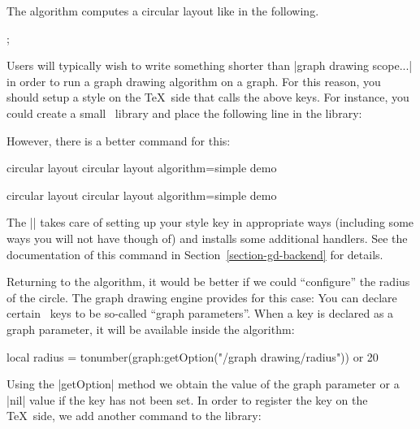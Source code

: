 The algorithm computes a circular layout like in the following.

\begin{codeexample}[]
\tikz [graph drawing scope, /graph drawing/algorithm=simple demo]
  ;
\end{codeexample}

Users will typically wish to write something shorter than
|graph drawing scope...| in order to run a graph drawing algorithm on
a graph. For this reason, you should setup a style on the \TeX\ side
that calls the above keys. For instance, you could create a small
\tikzname\ library and place the following line in the library:
\begin{codeexample}
\end{codeexample}
However, there is a better command for this:
\begin{codeexample}[code only]
\pgfgddeclarealgorithmkey
{circular layout}
{circular layout}
{algorithm=simple demo}
{}
\end{codeexample}
\pgfgddeclarealgorithmkey
{circular layout}
{circular layout}
{algorithm=simple demo}
{}

The |\pgfgddeclarealgorithmkey| takes care of setting up your style
key in appropriate ways (including some ways you will not have though
of) and installs some additional handlers. See the documentation of
this command in Section~\ref{section-gd-backend} for details. 

Returning to the algorithm, it would be better if we could
``configure'' the radius of the circle. The graph drawing engine
provides for this case: You can declare certain \pgfname\ keys to be
so-called ``graph parameters''. When a key is declared as a graph
parameter, it will be available inside the algorithm: 

\begin{codeexample}
   local radius = tonumber(graph:getOption("/graph drawing/radius")) or 20
\end{codeexample}

Using the |getOption| method we obtain the value of the
graph parameter or a |nil| value if the key has not been set. In order
to register the key on the \TeX\ side, we add another command to the
library: 

\begin{codeexample}
\end{codeexample}

